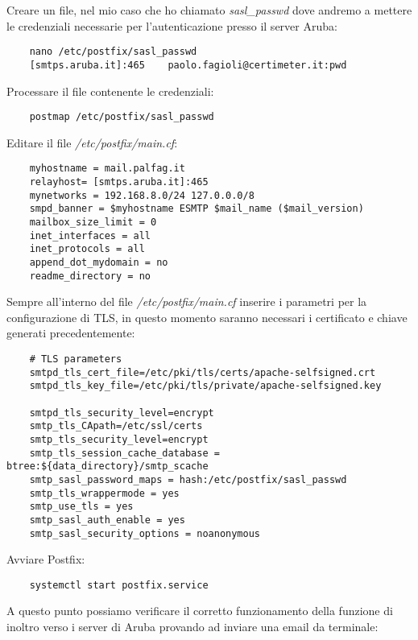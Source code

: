 Creare un file, nel mio caso che ho chiamato \textit{sasl\_passwd} dove andremo a mettere le credenziali
necessarie per l'autenticazione presso il server Aruba:

\begin{verbatim}
    nano /etc/postfix/sasl_passwd
    [smtps.aruba.it]:465    paolo.fagioli@certimeter.it:pwd
\end{verbatim}

Processare il file contenente le credenziali:

\begin{verbatim}
    postmap /etc/postfix/sasl_passwd
\end{verbatim}

Editare il file \textit{/etc/postfix/main.cf}:

\begin{verbatim}
    myhostname = mail.palfag.it
    relayhost= [smtps.aruba.it]:465
    mynetworks = 192.168.8.0/24 127.0.0.0/8
    smpd_banner = $myhostname ESMTP $mail_name ($mail_version)
    mailbox_size_limit = 0
    inet_interfaces = all
    inet_protocols = all
    append_dot_mydomain = no
    readme_directory = no
\end{verbatim}

Sempre all'interno del file \textit{/etc/postfix/main.cf} inserire i parametri per la configurazione di TLS,
in questo momento saranno necessari i certificato e chiave generati precedentemente:

\begin{verbatim}
    # TLS parameters
    smtpd_tls_cert_file=/etc/pki/tls/certs/apache-selfsigned.crt
    smtpd_tls_key_file=/etc/pki/tls/private/apache-selfsigned.key

    smtpd_tls_security_level=encrypt
    smtp_tls_CApath=/etc/ssl/certs
    smtp_tls_security_level=encrypt
    smtp_tls_session_cache_database = btree:${data_directory}/smtp_scache
    smtp_sasl_password_maps = hash:/etc/postfix/sasl_passwd
    smtp_tls_wrappermode = yes
    smtp_use_tls = yes
    smtp_sasl_auth_enable = yes
    smtp_sasl_security_options = noanonymous
\end{verbatim}

Avviare Postfix:
\begin{verbatim}
    systemctl start postfix.service
\end{verbatim}

A questo punto possiamo verificare il corretto funzionamento della funzione di inoltro verso i server di Aruba 
provando ad inviare una email da terminale:

